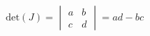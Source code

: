 \documentclass[preview]{standalone}
\begin{document}
$\displaystyle
  \mathrm{det}(J) = 
  \begin{vmatrix}
    a & b \\
    c & d 
  \end{vmatrix} =
  ad-bc
$
\end{document}
